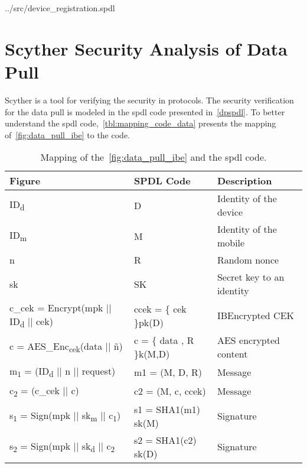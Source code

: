 \begin{lstinputlisting}
[language=Python, label={drspdl}, caption={Device Registration SPDL}]{../src/device_registration.spdl}
\end{lstinputlisting}

\clearpage
\section{Scyther Security Analysis of Data Pull}\label{apx:scyther-analysis-dp}
Scyther is a tool for verifying the security in protocols.
The security verification for the data pull is modeled in the \gls{spdl} code presented in~\autoref{dpspdl}.
To better understand the \gls{spdl} code,~\autoref{tbl:mapping_code_data} presents the mapping of~\autoref{fig:data_pull_ibe} to the code.

\begin{table}[h]
  \begin{tabular}{lll}
  Figure      				    & SPDL Code     		  & Description 				      \\ \hline
  ID\textsubscript{d}  		& D   						    & Identity of the device 	  \\ %
  ID\textsubscript{m}   	& M      					    & Identity of the mobile	  \\ %
  n      					        & R            				& Random nonce 				      \\ %
  sk      					      & SK           				& Secret key to an identity	\\ %
  c\_cek = Encrypt(mpk || ID\textsubscript{d} || cek)	& ccek = \{ cek \}pk(D) 		& IBEncrypted CEK 	\\
  c = AES\_Enc\textsubscript{cek}(data || \~{n}) 		& c = \{ data , R \}k(M,D) 	& AES encrypted content 	\\
  m\textsubscript{1} = (ID\textsubscript{d} || n || request)  & m1 = (M, D, R)   	& Message		\\ %
  c\textsubscript{2} = (c\_cek || c)     	& c2 = (M, c, ccek)						& Message 	\\ %
  s\textsubscript{1} = Sign(mpk || sk\textsubscript{m} || c\textsubscript{1})      	& s1 = { SHA1(m1) }sk(M)   & Signature				\\ %
  s\textsubscript{2} = Sign(mpk || sk\textsubscript{d} || c\textsubscript{2}      	& s2 = { SHA1(c2) }sk(D)   & Signature				\\ %
  \end{tabular}
  \caption[SPDL mapping data pull]{Mapping of the~\autoref{fig:data_pull_ibe} and the \gls{spdl} code.}
  \label{tbl:mapping_code_data}
\end{table}

